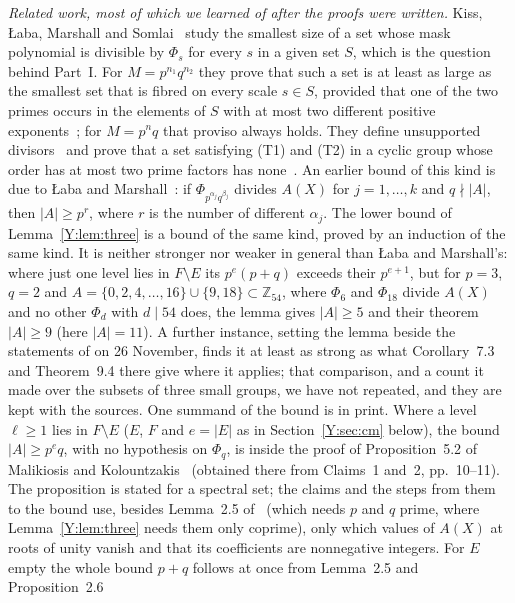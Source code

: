 \documentclass[11pt,a4paper]{amsart}
\theoremstyle{definition}
\theoremstyle{remark}
\newcommand{\Z}{\mathbb{Z}}
\begin{document}
\emph{Related work, most of which we learned of after the proofs were written.} Kiss, {\L}aba, Marshall and
Somlai~\cite{KLaMS} study the smallest size of a set whose mask polynomial is divisible by $\Phi_s$ for every $s$
in a given set $S$, which is the question behind Part~I. For $M=p^{n_1}q^{n_2}$ they prove that such a set is at
least as large as the smallest set that is fibred on every scale $s\in S$, provided that one of the two primes
occurs in the elements of $S$ with at most two different positive exponents~\cite[Corollary~7.3]{KLaMS}; for
$M=p^nq$ that proviso always holds. They define unsupported divisors~\cite[Definition~1.5]{KLaMS} and prove that
a set satisfying (T1) and (T2) in a cyclic group whose order has at most two prime factors has
none~\cite[Theorem~1.12]{KLaMS}. An earlier bound of this kind is due to {\L}aba and
Marshall~\cite[Theorem~1.2]{LaM}: if $\Phi_{p^{\alpha_j}q^{\beta_j}}$ divides $A(X)$ for $j=1,\dots,k$ and
$q\nmid|A|$, then $|A|\ge p^{r}$, where $r$ is the number of different $\alpha_j$. The lower bound of
Lemma~\ref{Y:lem:three} is a bound of the same kind, proved by an induction of the same kind. It is neither
stronger nor weaker in general than {\L}aba and Marshall's: where just one level lies in $F\setminus E$ its
$p^e(p+q)$ exceeds their $p^{e+1}$, but for $p=3$, $q=2$ and $A=\{0,2,4,\dots,16\}\cup\{9,18\}\subset\Z_{54}$,
where $\Phi_6$ and $\Phi_{18}$ divide $A(X)$ and no other $\Phi_d$ with $d\mid 54$ does, the lemma gives
$|A|\ge5$ and their theorem $|A|\ge9$ (here $|A|=11$). A further instance, setting the lemma beside the
statements of \cite{KLaMS} on 26 November, finds it at least as strong as what Corollary~7.3 and Theorem~9.4
there give where it applies; that comparison, and a count it made over the subsets of three small groups, we
have not repeated, and they are kept with the sources. One summand of the bound is in print. Where a level $\ell\ge1$ lies
in $F\setminus E$ ($E$, $F$ and $e=|E|$ as in Section~\ref{Y:sec:cm} below), the bound $|A|\ge p^{e}q$, with no hypothesis on $\Phi_q$, is inside the proof of
Proposition~5.2 of Malikiosis and Kolountzakis~\cite{MK} (obtained there from Claims~1 and~2, pp.~10--11). The proposition is stated for a
spectral set; the claims and the steps from them to the bound use, besides Lemma~2.5 of~\cite{MK} (which needs $p$ and $q$ prime, where Lemma~\ref{Y:lem:three} needs them only coprime), only which values of $A(X)$ at roots of unity vanish and that its coefficients
are nonnegative integers. For $E$ empty the whole bound $p+q$ follows at once from Lemma~2.5 and Proposition~2.6
\end{document}
